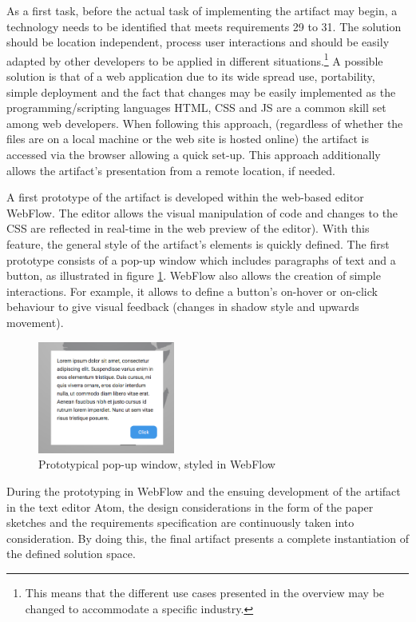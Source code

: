 As a first task, before the actual task of implementing the artifact may begin, a technology needs to be identified that meets requirements 29 to 31. The solution should be location independent, process user interactions and should be easily adapted by other developers to be applied in different situations.\footnote{This means that the different use cases presented in the overview may be changed to accommodate a specific industry.} A possible solution is that of a web application due to its wide spread use, portability, simple deployment and the fact that changes may be easily implemented as the programming/scripting languages \ac{HTML}, \ac{CSS} and \acl{JS} are a common skill set among web developers. When following this approach, (regardless of whether the files are on a local machine or the web site is hosted online) the artifact is accessed via the browser allowing a quick set-up. This approach additionally allows the artifact's presentation from a remote location, if needed.

A first prototype of the artifact is developed within the web-based editor WebFlow. The editor allows the visual manipulation of code and changes to the \ac{CSS} are reflected in real-time in the web preview of the editor). With this feature, the general style of the artifact's elements is quickly defined. The first prototype consists of a pop-up window which includes paragraphs of text and a button, as illustrated in figure \ref{fig:proto1}. WebFlow also allows the creation of simple interactions. For example, it allows to define a button's on-hover or on-click behaviour to give visual feedback (changes in shadow style and upwards movement).

\begin{figure}
    \centering
    \includegraphics[width=0.4\textwidth]{latex-vorlage_v1.5/graphics/Prototype1.png}
    \caption{Prototypical pop-up window, styled in WebFlow}
    \label{fig:proto1}
\end{figure}

During the prototyping in WebFlow and the ensuing development of the artifact in the text editor Atom, the design considerations in the form of the paper sketches and the requirements specification are continuously taken into consideration. By doing this, the final artifact presents a complete instantiation of the defined solution space.

